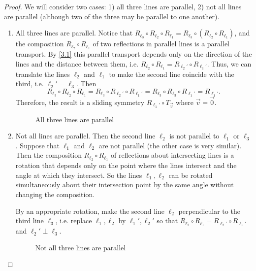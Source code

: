 \documentclass{article}
\begin{document}
\begin{proof}
We will consider two cases: 1) all three lines are parallel, 2) not all lines are parallel (although two of the three may be parallel to one another).
\begin{enumerate}[label=(\arabic*)]
    \item All three lines are parallel. Notice that $R_{\ell_3}\circ R_{\ell_2}\circ R_{\ell_1}=R_{\ell_3}\circ (R_{\ell_2}\circ R_{\ell_1})$, and the composition $R_{\ell_2}\circ R_{\ell_1}$ of two reflections in parallel lines is a parallel transport. By \ref{3.1} this parallel transport depends only on the direction of the lines and the distance between them, i.e. $R_{\ell_2}\circ R_{\ell_1}=R_{\ell_2'}\circ R_{\ell_1'}$. Thus, we can translate the lines $\ell_2$ and $\ell_1$ to make the second line coincide with the third, i.e. $\ell_2'=\ell_3$. Then
    \[R_{\ell_3}\circ R_{\ell_2}\circ R_{\ell_1}=R_{\ell_3}\circ R_{\ell_2'}\circ R_{\ell_1'}=R_{\ell_3}\circ R_{\ell_3}\circ R_{\ell_1'}=R_{\ell_1'}.\]
    Therefore, the result is a sliding symmetry $R_{\ell_1'}\circ T_{\overrightarrow{v}}$ where $\overrightarrow{v}=\overrightarrow{0}$.
    
    \begin{figure}[h]
        \centering
        
        \caption{All three lines are parallel}
    \end{figure}
    
    \item Not all lines are parallel. Then the second line $\ell_2$ is not parallel to $\ell_1$ or $\ell_3$. Suppose that $\ell_1$ and $\ell_2$ are not parallel (the other case is very similar). Then the composition $R_{\ell_2}\circ R_{\ell_1}$ of reflections about intersecting lines is a rotation that depends only on the point where the lines intersect and the angle at which they intersect. So the lines $\ell_1, \ell_2$ can be rotated simultaneously about their intersection point by the same angle without changing the composition.
    \par By an appropriate rotation, make the second line $\ell_2$ perpendicular to the third line $\ell_3$, i.e. replace $\ell_1,\ell_2$ by $\ell_1',\ell_2'$ so that $R_{\ell_2}\circ R_{\ell_1}=R_{\ell_2'}\circ R_{\ell_1'}$ and $\ell_2' \perp \ell_3$.
    
    \begin{figure}[h]
        \centering
        
        \caption{Not all three lines are parallel}
    \end{figure}
    

\end{enumerate}
\end{proof}
\end{document}
